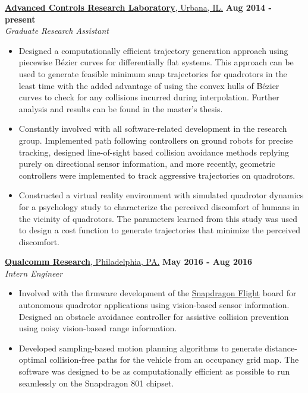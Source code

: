\documentclass[10pt]{article}
\renewcommand{\section}[2]%
        {\pagebreak[2]\vspace{1.3\baselineskip}%
         \phantomsection\addcontentsline{toc}{section}{#1}%
         \hspace{0in}%
         \marginpar{
         \raggedright \scshape #1}#2}
\newenvironment{outerlist}[1][\enskip\textbullet]%
        {\begin{itemize}[#1]}{\end{itemize}%
         \vspace{-.6\baselineskip}}
\newcommand{\blankline}{\quad\pagebreak[2]}
\begin{document}
\section{Experience}
\href{http://naira.mechse.illinois.edu/}{\textbf{Advanced Controls Research Laboratory}, Urbana, IL.}
\hfill \textbf{Aug 2014 - }\textbf{present} \\
\textit{Graduate Research Assistant}%
\begin{outerlist}
\item Designed a computationally efficient trajectory generation approach using piecewise B\'ezier curves for differentially flat systems. This approach can be used to generate feasible minimum snap trajectories for quadrotors in the least time with the added advantage of using the convex hulls of B\'ezier curves to check for any collisions incurred during interpolation. Further analysis and results can be found in the master's thesis.
\item Constantly involved with all software-related development in the research group. Implemented path following controllers on ground robots for precise tracking, designed line-of-sight based collision avoidance methods replying purely on directional sensor information, and more recently, geometric controllers were implemented to track aggressive trajectories on quadrotors.
\item Constructed a virtual reality environment with simulated quadrotor dynamics for a psychology study to characterize the perceived discomfort of humans in the vicinity of quadrotors. The parameters learned from this study was used to design a cost function to generate trajectories that minimize the perceived discomfort.
\end{outerlist}
\blankline

\href{https://www.pennovation.upenn.edu/the-community/innovators/qualcomm-research-philadelphia}{\textbf{Qualcomm Research}, Philadelphia, PA.}
\hfill \textbf{May 2016 - Aug 2016} \\
\textit{Intern Engineer}%
\begin{outerlist}
\item Involved with the firmware development of the \href{https://developer.qualcomm.com/hardware/snapdragon-flight}{Snapdragon Flight} board for autonomous quadrotor applications using vision-based sensor information. Designed an obstacle avoidance controller for assistive collision prevention using noisy vision-based range information.
\item Developed sampling-based motion planning algorithms to generate distance-optimal collision-free paths for the vehicle from an occupancy grid map. The software was designed to be as computationally efficient as possible to run seamlessly on the Snapdragon 801 chipset.
\end{outerlist}
\blankline
\end{document}

